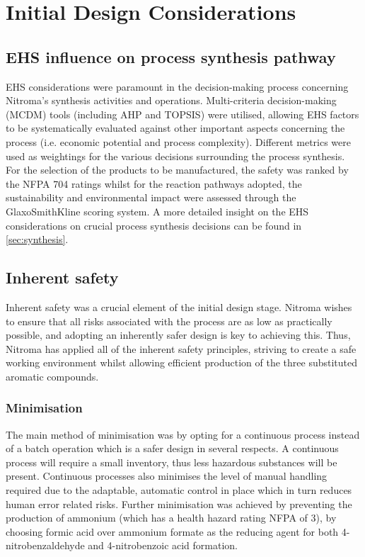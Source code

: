  
\section{Initial Design Considerations}

\subsection{EHS influence on process synthesis pathway}

EHS considerations were paramount in the decision-making process concerning Nitroma’s synthesis activities and operations. Multi-criteria decision-making (MCDM) tools (including AHP and TOPSIS) were utilised, allowing EHS factors to be systematically evaluated against other important aspects concerning the process (i.e. economic potential and process complexity). Different metrics were used as weightings for the various decisions surrounding the process synthesis. For the selection of the products to be manufactured, the safety was ranked by the NFPA 704 ratings whilst for the reaction pathways adopted, the sustainability and environmental impact were assessed through the GlaxoSmithKline scoring system. A more detailed insight on the EHS considerations on crucial process synthesis decisions can be found in \cref{sec:synthesis}. 

\subsection{Inherent safety}
\label{sec:inherentsafety}

Inherent safety was a crucial element of the initial design stage. Nitroma wishes to ensure that all risks associated with the process are as low as practically possible, and adopting an inherently safer design is key to achieving this. Thus, Nitroma has applied all of the inherent safety principles, striving to create a safe working environment whilst allowing efficient production of the three substituted aromatic compounds. 

\subsubsection{Minimisation}
The main method of minimisation was by opting for a continuous process instead of a batch operation which is a safer design in several respects. A continuous process will require a small inventory, thus less hazardous substances will be present. Continuous processes also minimises the level of manual handling required due to the adaptable, automatic control in place which in turn reduces human error related risks. 
Further minimisation was achieved by preventing the production of ammonium (which has a health hazard rating NFPA of 3), by choosing formic acid over ammonium formate as the reducing agent for both 4-nitrobenzaldehyde and 4-nitrobenzoic acid formation. 



